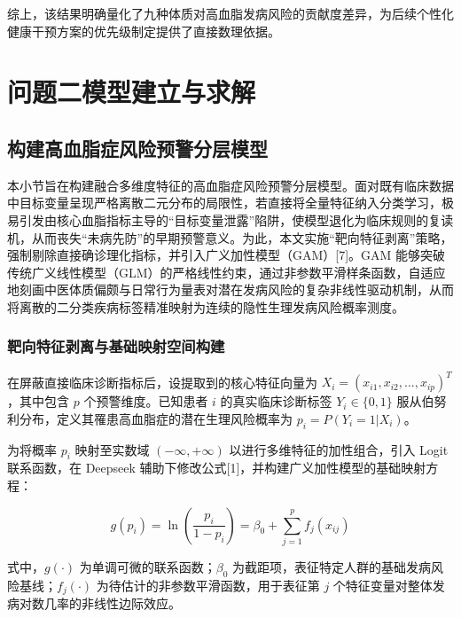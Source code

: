 \documentclass[12pt]{article}
\begin{document}
	
	{\songti{}
		综上，该结果明确量化了九种体质对高血脂发病风险的贡献度差异，为后续个性化健康干预方案的优先级制定提供了直接数理依据。
		\par}
	
	\section{问题二模型建立与求解}
	\subsection{构建高血脂症风险预警分层模型}
	{\songti{}
		本小节旨在构建融合多维度特征的高血脂症风险预警分层模型。面对既有临床数据中目标变量呈现严格离散二元分布的局限性，若直接将全量特征纳入分类学习，极易引发由核心血脂指标主导的“目标变量泄露”陷阱，使模型退化为临床规则的复读机，从而丧失“未病先防”的早期预警意义。为此，本文实施“靶向特征剥离”策略，强制剔除直接确诊理化指标，并引入广义加性模型（GAM）[7]。GAM 能够突破传统广义线性模型（GLM）的严格线性约束，通过非参数平滑样条函数，自适应地刻画中医体质偏颇与日常行为量表对潜在发病风险的复杂非线性驱动机制，从而将离散的二分类疾病标签精准映射为连续的隐性生理发病风险概率测度。
		\par}
	
	
	\subsubsection{靶向特征剥离与基础映射空间构建}
	{\songti{}
		在屏蔽直接临床诊断指标后，设提取到的核心特征向量为 $X_i = (x_{i1},x_{i2},...,x_{ip})^T$，其中包含 $p$ 个预警维度。已知患者 $i$ 的真实临床诊断标签 $Y_i \in \{0,1\}$ 服从伯努利分布，定义其罹患高血脂症的潜在生理风险概率为 $p_i = P(Y_i=1|X_i)$。
		\par}
	
	{\songti{}
		为将概率 $p_i$ 映射至实数域 $(-\infty,+\infty)$ 以进行多维特征的加性组合，引入 Logit 联系函数，在 Deepseek 辅助下修改公式[1]，并构建广义加性模型的基础映射方程：
		\par}
	
	\begin{equation}
		g(p_i) = \ln\left( \frac{p_i}{1-p_i} \right) = \beta_0 + \sum_{j=1}^{p} f_j(x_{ij})
	\end{equation}
	
	{\songti{}
		式中，$g(\cdot)$ 为单调可微的联系函数；$\beta_0$ 为截距项，表征特定人群的基础发病风险基线；$f_j(\cdot)$ 为待估计的非参数平滑函数，用于表征第 $j$ 个特征变量对整体发病对数几率的非线性边际效应。
		\par}
	
\end{document}
